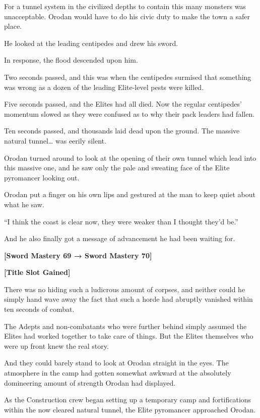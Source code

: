 \documentclass[a4paper,10pt]{book}
\begin{document}
For a tunnel system in the civilized depths to contain this many monsters was unacceptable. Orodan would have to do his civic duty to make the town a safer place.\par
He looked at the leading centipedes and drew his sword.\par
In response, the flood descended upon him.\par
Two seconds passed, and this was when the centipedes surmised that something was wrong as a dozen of the leading Elite-level pests were killed.\par
Five seconds passed, and the Elites had all died. Now the regular centipedes’ momentum slowed as they were confused as to why their pack leaders had fallen.\par
Ten seconds passed, and thousands laid dead upon the ground. The massive natural tunnel… was eerily silent.\par
Orodan turned around to look at the opening of their own tunnel which lead into this massive one, and he saw only the pale and sweating face of the Elite pyromancer looking out.\par
Orodan put a finger on his own lips and gestured at the man to keep quiet about what he saw.\par
“I think the coast is clear now, they were weaker than I thought they’d be.”\par
And he also finally got a message of advancement he had been waiting for.\par
\textbf{[Sword Mastery 69 → Sword Mastery 70]}\par
\textbf{[Title Slot Gained]}\par
\par
There was no hiding such a ludicrous amount of corpses, and neither could he simply hand wave away the fact that such a horde had abruptly vanished within ten seconds of combat.\par
The Adepts and non-combatants who were further behind simply assumed the Elites had worked together to take care of things. But the Elites themselves who were up front knew the real story.\par
And they could barely stand to look at Orodan straight in the eyes. The atmosphere in the camp had gotten somewhat awkward at the absolutely domineering amount of strength Orodan had displayed.\par
As the Construction crew began setting up a temporary camp and fortifications within the now cleared natural tunnel, the Elite pyromancer approached Orodan.\par
\end{document}
